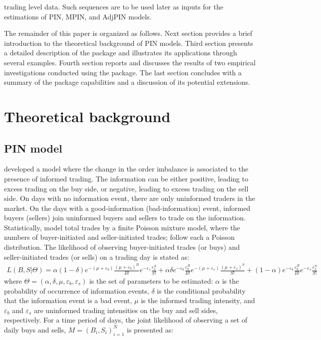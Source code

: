 trading level data. Such sequences are to be used later as inputs for the estimations of PIN, MPIN, and AdjPIN models.

The remainder of this paper is organized as follows. Next section provides a brief introduction to the theoretical background of PIN models. Third section presents a detailed description of the package and illustrates its applications through several examples. Fourth section reports and discusses the results of two empirical investigations conducted using the package. The last section concludes with a summary of the package capabilities and a discussion of its potential extensions.

\section{Theoretical background}
\subsection{PIN model}

\cite{easley1992time} developed a model where the change in the order imbalance is associated to the presence of informed trading. The information can be either positive, leading to excess trading on the buy side, or negative, leading to excess trading on the sell side. On days with no information event, there are only uninformed traders in the market. On the days with a good-information (bad-information) event, informed buyers (sellers) join uninformed buyers and sellers to trade on the information. Statistically, \cite{easley1996liquidity} model total trades by a finite Poisson mixture model, where the numbers of buyer-initiated and seller-initiated trades; follow each a Poisson distribution. The likelihood of observing  buyer-initiated trades (or buys) and  seller-initiated trades (or sells) on a trading day is stated as:
\begin{equation}
\label{eq:pindaylkd}
\begin{split}
 L\left(B,S|\Theta\right) = \alpha(1-\delta)e^{-\left(\mu +\varepsilon_{b}\right)}\tfrac{\left(\mu +\varepsilon_{b}\right)^{B}}{B!}e^{-\varepsilon_{s}}\tfrac{\varepsilon_{s}^{S}}{S!}+\alpha \delta e^{-\varepsilon_{b}}\tfrac{\varepsilon_{b}^{B}}{B!}e^{-\left(\mu +\varepsilon_{s}\right)}\tfrac{\left(\mu +\varepsilon_{s}\right)^{S}}{S!}+\left(1-\alpha\right)e^{-\varepsilon_{b}}\tfrac{\varepsilon_{b}^{B}}{B!}e^{-\varepsilon_{s}}\tfrac{\varepsilon_{s}^{S}}{S!} 
\end{split}
\end{equation}
where \(\Theta  =\left(\alpha , \delta ,\mu ,\varepsilon_{b},\varepsilon_{s}\right)\) is the set of parameters to be estimated: \(\alpha\) is the probability of occurrence of information events, \(\delta\) is the conditional probability that the information event is a bad event, \(\mu\) is the informed trading intensity, and \( \varepsilon_{b}\) and \( \varepsilon_{s}\) are uninformed trading intensities on the buy and sell sides, respectively. For a time period of  days, the joint likelihood of observing a set of daily buys and sells, \( M =\left(B_{i}, S_{i}\right)_{i = 1}^{N}\) is presented as:

